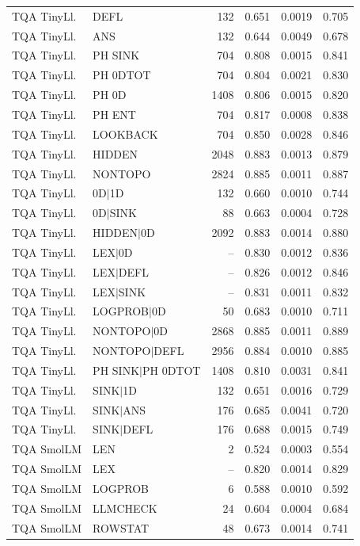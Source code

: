 \begin{longtable}{llrrrr}
TQA TinyLl. & DEFL & 132 & 0.651 & 0.0019 & 0.705 \\
TQA TinyLl. & ANS & 132 & 0.644 & 0.0049 & 0.678 \\
TQA TinyLl. & PH SINK & 704 & 0.808 & 0.0015 & 0.841 \\
TQA TinyLl. & PH 0DTOT & 704 & 0.804 & 0.0021 & 0.830 \\
TQA TinyLl. & PH 0D & 1408 & 0.806 & 0.0015 & 0.820 \\
TQA TinyLl. & PH ENT & 704 & 0.817 & 0.0008 & 0.838 \\
TQA TinyLl. & LOOKBACK & 704 & 0.850 & 0.0028 & 0.846 \\
TQA TinyLl. & HIDDEN & 2048 & 0.883 & 0.0013 & 0.879 \\
TQA TinyLl. & NONTOPO & 2824 & 0.885 & 0.0011 & 0.887 \\
TQA TinyLl. & 0D$\mid$1D & 132 & 0.660 & 0.0010 & 0.744 \\
TQA TinyLl. & 0D$\mid$SINK & 88 & 0.663 & 0.0004 & 0.728 \\
TQA TinyLl. & HIDDEN$\mid$0D & 2092 & 0.883 & 0.0014 & 0.880 \\
TQA TinyLl. & LEX$\mid$0D & -- & 0.830 & 0.0012 & 0.836 \\
TQA TinyLl. & LEX$\mid$DEFL & -- & 0.826 & 0.0012 & 0.846 \\
TQA TinyLl. & LEX$\mid$SINK & -- & 0.831 & 0.0011 & 0.832 \\
TQA TinyLl. & LOGPROB$\mid$0D & 50 & 0.683 & 0.0010 & 0.711 \\
TQA TinyLl. & NONTOPO$\mid$0D & 2868 & 0.885 & 0.0011 & 0.889 \\
TQA TinyLl. & NONTOPO$\mid$DEFL & 2956 & 0.884 & 0.0010 & 0.885 \\
TQA TinyLl. & PH SINK$\mid$PH 0DTOT & 1408 & 0.810 & 0.0031 & 0.841 \\
TQA TinyLl. & SINK$\mid$1D & 132 & 0.651 & 0.0016 & 0.729 \\
TQA TinyLl. & SINK$\mid$ANS & 176 & 0.685 & 0.0041 & 0.720 \\
TQA TinyLl. & SINK$\mid$DEFL & 176 & 0.688 & 0.0015 & 0.749 \\
TQA SmolLM & LEN & 2 & 0.524 & 0.0003 & 0.554 \\
TQA SmolLM & LEX & -- & 0.820 & 0.0014 & 0.829 \\
TQA SmolLM & LOGPROB & 6 & 0.588 & 0.0010 & 0.592 \\
TQA SmolLM & LLMCHECK & 24 & 0.604 & 0.0004 & 0.684 \\
TQA SmolLM & ROWSTAT & 48 & 0.673 & 0.0014 & 0.741 \\

\end{longtable}
